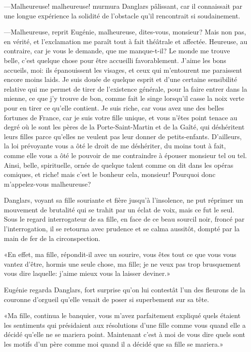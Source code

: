 —Malheureuse! malheureuse! murmura Danglars pâlissant, car il connaissait par une longue expérience la solidité de l'obstacle qu'il rencontrait si soudainement. 

—Malheureuse, reprit Eugénie, malheureuse, dites-vous, monsieur? Mais non pas, en vérité, et l'exclamation me paraît tout à fait théâtrale et affectée. Heureuse, au contraire, car je vous le demande, que me manque-t-il? Le monde me trouve belle, c'est quelque chose pour être accueilli favorablement. J'aime les bons accueils, moi: ils épanouissent les visages, et ceux qui m'entourent me paraissent encore moins laids. Je suis douée de quelque esprit et d'une certaine sensibilité relative qui me permet de tirer de l'existence générale, pour la faire entrer dans la mienne, ce que j'y trouve de bon, comme fait le singe lorsqu'il casse la noix verte pour en tirer ce qu'elle contient. Je suis riche, car vous avez une des belles fortunes de France, car je suis votre fille unique, et vous n'êtes point tenace au degré où le sont les pères de la Porte-Saint-Martin et de la Gaîté, qui déshéritent leurs filles parce qu'elles ne veulent pas leur donner de petits-enfants. D'ailleurs, la loi prévoyante vous a ôté le droit de me déshériter, du moins tout à fait, comme elle vous a ôté le pouvoir de me contraindre à épouser monsieur tel ou tel. Ainsi, belle, spirituelle, ornée de quelque talent comme on dit dans les opéras comiques, et riche! mais c'est le bonheur cela, monsieur! Pourquoi donc m'appelez-vous malheureuse? 

Danglars, voyant sa fille souriante et fière jusqu'à l'insolence, ne put réprimer un mouvement de brutalité qui se trahit par un éclat de voix, mais ce fut le seul. Sous le regard interrogateur de sa fille, en face de ce beau sourcil noir, froncé par l'interrogation, il se retourna avec prudence et se calma aussitôt, dompté par la main de fer de la circonspection. 

«En effet, ma fille, répondit-il avec un sourire, vous êtes tout ce que vous vous vantez d'être, hormis une seule chose, ma fille; je ne veux pas trop brusquement vous dire laquelle: j'aime mieux vous la laisser deviner.» 

Eugénie regarda Danglars, fort surprise qu'on lui contestât l'un des fleurons de la couronne d'orgueil qu'elle venait de poser si superbement sur sa tête. 

«Ma fille, continua le banquier, vous m'avez parfaitement expliqué quels étaient les sentiments qui présidaient aux résolutions d'une fille comme vous quand elle a décidé qu'elle ne se mariera point. Maintenant c'est à moi de vous dire quels sont les motifs d'un père comme moi quand il a décidé que sa fille se mariera.» 

